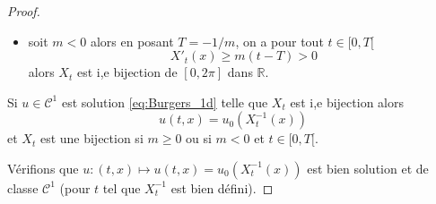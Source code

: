 \begin{proof}
\begin{itemize}
\item soit $m < 0$ alors en posant $T = -1/m$, on a pour tout $t \in [0, T[$
\begin{equation}
X'_t(x) \geq m(t-T) > 0
\end{equation}
alors $X_t$ est i,e bijection de $[0, 2 \pi]$ dans $\mathbb{R}$.
\end{itemize}

Si $u \in \mathcal{C}^1$ est solution \eqref{eq:Burgers_1d} telle que $X_t$ est i,e bijection alors
\begin{equation}
u(t,x) = u_0(X_t^{-1}(x))
\end{equation}
et $X_t$ est une bijection si $m \geq 0$ ou si $m<0$ et $t \in [0, T[$.

Vérifions que $u : (t,x) \mapsto u(t,x) = u_0(X_t^{-1}(x))$ est bien solution et de classe $\mathcal{C}^1$ (pour $t$ tel que $X_t^{-1}$ est bien défini).


\end{proof}
